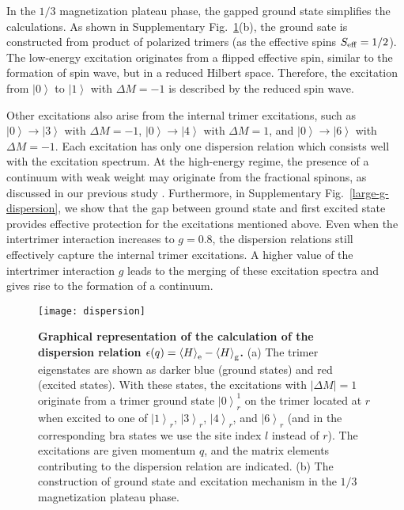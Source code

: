 \documentclass[aps,prx,showpacs,floatfix,twocolumn,superscriptaddress,nofootinbib,longbibliography]{revtex4-2}
\begin{document}
  In the   $1/3 $ magnetization  plateau phase, the gapped ground state simplifies  the calculations. As shown in  Supplementary Fig.~\ref{dispersion-cal}(b),  the  ground sate is constructed from product of polarized trimers (as the effective spins $S_{\rm{eff}}=1/2$).  The low-energy excitation originates from a flipped effective spin, similar to the formation of spin wave,  but in a reduced Hilbert space. Therefore, the  excitation from $\left|0\right\rangle$ to $\left|1\right\rangle$ with $\Delta M =-1$ is described by the reduced spin wave.
  
  
  Other excitations also arise from the internal trimer excitations, such as  $\left|0\right\rangle \rightarrow \left|3\right\rangle$ with $\Delta M =-1$, $\left|0\right\rangle \rightarrow \left|4\right\rangle$ with $\Delta M =1$, and $\left|0\right\rangle \rightarrow \left|6\right\rangle$ with $\Delta M =-1$. Each excitation  has only one  dispersion relation which consists well with the excitation spectrum. At the high-energy regime, the presence of a continuum with  weak weight may  originate from the fractional spinons, as discussed in our previous study \cite{cheng2022}. Furthermore, in Supplementary Fig.~\ref{large-g-dispersion}, we show that  the gap between ground state and first excited state provides effective protection for the excitations mentioned above. Even when the intertrimer interaction increases to $g=0.8$, the dispersion relations still effectively capture the internal trimer excitations. A higher value of the intertrimer interaction $g$ leads to the merging of these excitation spectra and gives rise to the formation of a continuum.
  
  
  
  
  
  
  
  \begin{figure*}[t]
	  \texttt{[image: dispersion]}
	  \caption{\label{dispersion-cal} \textbf{Graphical representation of the calculation of the dispersion relation
	  $\epsilon(q)=\left\langle H \right\rangle_{\rm{e}} - \left\langle H \right\rangle_{\rm{g}}$.} (a) The  trimer eigenstates  are shown as darker blue (ground states)
	  and  red (excited states). With these states, the  excitations with $|\Delta M|=1$ originate from a trimer ground state
	  $\left|0\right\rangle^{1}_r$ on the trimer located at $r$ when excited to one of  $\left|1\right\rangle_r$, $\left|3\right\rangle_r$, $\left|4\right\rangle_r$, and $\left|6\right\rangle_r$ (and in the corresponding bra states we use the site index $l$ instead of $r$). The excitations are given momentum $q$, and the matrix elements contributing
	  to the dispersion relation are indicated. (b) The construction of ground state and excitation mechanism
  in the  $1/3 $ magnetization  plateau phase.}
  \end{figure*}
  
\end{document}
